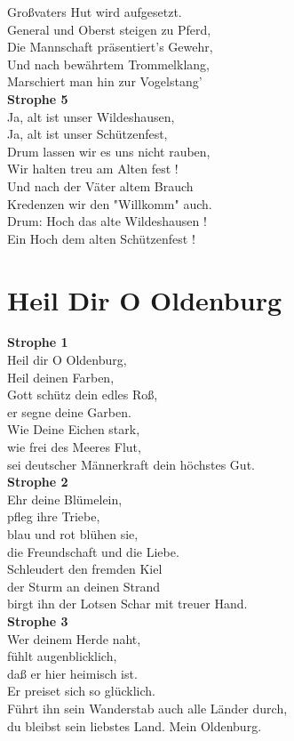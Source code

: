 \documentclass[twoside,8pt]{scrartcl}
\begin{document}
Großvaters Hut wird aufgesetzt.\\
General und Oberst steigen zu Pferd,\\
Die Mannschaft präsentiert's Gewehr,\\
Und nach bewährtem Trommelklang,\\
Marschiert man hin zur Vogelstang'\\
\newline
\textbf{Strophe 5}\\
Ja, alt ist unser Wildeshausen,\\
Ja, alt ist unser Schützenfest,\\
Drum lassen wir es uns nicht rauben,\\
Wir halten treu am Alten fest !\\
Und nach der Väter altem Brauch\\
Kredenzen wir den "Willkomm" auch.\\
Drum: Hoch das alte Wildeshausen !\\
Ein Hoch dem alten Schützenfest !	\\

\clearpage
\section{Heil Dir O Oldenburg}
\textbf{Strophe 1}\\
Heil dir O Oldenburg,\\
Heil deinen Farben,\\
Gott schütz dein edles Roß,\\
er segne deine Garben. \\
Wie Deine Eichen stark,\\
wie frei des Meeres Flut,\\
sei deutscher Männerkraft dein höchstes Gut.\\
\newline
\textbf{Strophe 2}\\
Ehr deine Blümelein,\\
pfleg ihre Triebe,\\
blau und rot blühen sie,\\
die Freundschaft und die Liebe. \\
Schleudert den fremden Kiel\\
der Sturm an deinen Strand\\
birgt ihn der Lotsen Schar mit treuer Hand.\\
\newline
\textbf{Strophe 3}\\
Wer deinem Herde naht,\\
fühlt augenblicklich,\\
daß er hier heimisch ist.\\
Er preiset sich so glücklich.\\
Führt ihn sein Wanderstab auch alle Länder durch,\\
du bleibst sein liebstes Land. Mein Oldenburg.\\
\end{document}
